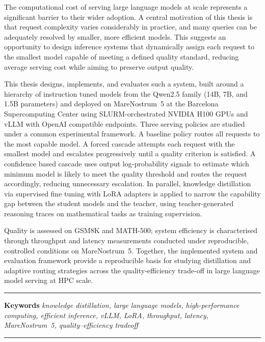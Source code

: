 \documentclass[11pt, a4paper]{article}
\begin{document}
\begin{singlespace}
\color{darkgray}\small

The computational cost of serving large language models at scale represents
a significant barrier to their wider adoption.
A central motivation of this thesis is that request complexity varies
considerably in practice, and many queries can be adequately resolved by
smaller, more efficient models.
This suggests an opportunity to design inference systems that dynamically
assign each request to the smallest model capable of meeting a defined
quality standard, reducing average serving cost while aiming to preserve
output quality.

This thesis designs, implements, and evaluates such a system, built around
a hierarchy of instruction tuned models from the Qwen2.5 family (14B, 7B,
and 1.5B parameters) and deployed on MareNostrum~5 at the Barcelona
Supercomputing Center using SLURM-orchestrated NVIDIA H100 GPUs and vLLM
with OpenAI compatible endpoints.
Three serving policies are studied under a common experimental framework.
A baseline policy routes all requests to the most capable model.
A forced cascade attempts each request with the smallest model and escalates
progressively until a quality criterion is satisfied.
A confidence based cascade uses output log-probability signals to estimate
which minimum model is likely to meet the quality threshold and routes the
request accordingly, reducing unnecessary escalation.
In parallel, knowledge distillation via supervised fine tuning with LoRA
adapters is applied to narrow the capability gap between the student models
and the teacher, using teacher-generated reasoning traces on mathematical
tasks as training supervision.

Quality is assessed on GSM8K and MATH-500; system efficiency is
characterised through throughput and latency measurements conducted under
reproducible, controlled conditions on MareNostrum~5.
Together, the implemented system and evaluation framework provide a
reproducible basis for studying distillation and adaptive routing strategies
across the quality-efficiency trade-off in large language model serving at
HPC scale.

\end{singlespace}


\vspace{0.3cm}
{\color{medgray}\rule{\linewidth}{0.5pt}}
\vspace{0.2cm}

{\small\color{darkgray}
  \textbf{\color{thesisblue}Keywords}\enspace
  \textit{%
    knowledge distillation,
    large language models,
    high-performance computing,
    efficient inference,
    vLLM,
    LoRA,
    throughput,
    latency,
    MareNostrum~5,
    quality--efficiency tradeoff%
  }
}

\vspace{0.3cm}
{\color{thesisblue}\rule{\linewidth}{2.4pt}}
\end{document}
